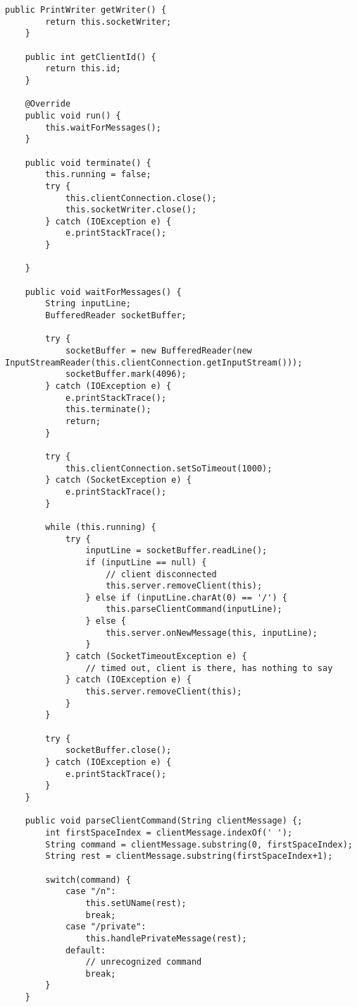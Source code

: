 \begin{enumerate}
\begin{lstlisting}[style=java]
    public PrintWriter getWriter() {
        return this.socketWriter;
    }

    public int getClientId() {
        return this.id;
    }

    @Override
    public void run() {
        this.waitForMessages();
    }

    public void terminate() {
        this.running = false;
        try {
            this.clientConnection.close();
            this.socketWriter.close();
        } catch (IOException e) {
            e.printStackTrace();
        }

    }

    public void waitForMessages() {
        String inputLine;
        BufferedReader socketBuffer;

        try {
            socketBuffer = new BufferedReader(new InputStreamReader(this.clientConnection.getInputStream()));
            socketBuffer.mark(4096);
        } catch (IOException e) {
            e.printStackTrace();
            this.terminate();
            return;
        }

        try {
            this.clientConnection.setSoTimeout(1000);
        } catch (SocketException e) {
            e.printStackTrace();
        }

        while (this.running) {
            try {
                inputLine = socketBuffer.readLine();
                if (inputLine == null) {
                    // client disconnected
                    this.server.removeClient(this);
                } else if (inputLine.charAt(0) == '/') {
                    this.parseClientCommand(inputLine);
                } else {
                    this.server.onNewMessage(this, inputLine);
                }
            } catch (SocketTimeoutException e) {
                // timed out, client is there, has nothing to say
            } catch (IOException e) {
                this.server.removeClient(this);
            }
        }

        try {
            socketBuffer.close();
        } catch (IOException e) {
            e.printStackTrace();
        }
    }

    public void parseClientCommand(String clientMessage) {;
        int firstSpaceIndex = clientMessage.indexOf(' ');
        String command = clientMessage.substring(0, firstSpaceIndex);
        String rest = clientMessage.substring(firstSpaceIndex+1);

        switch(command) {
            case "/n":
                this.setUName(rest);
                break;
            case "/private":
                this.handlePrivateMessage(rest);
            default:
                // unrecognized command
                break;
        }
    }


\end{lstlisting}
\end{enumerate}
